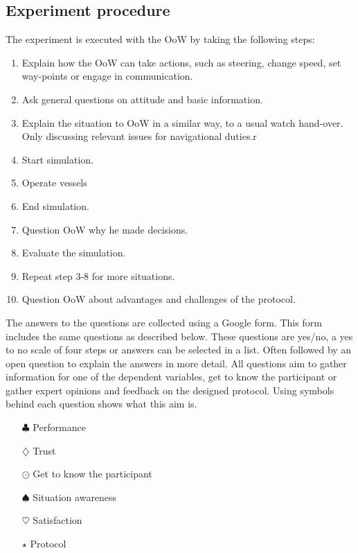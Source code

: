 \subsection{Experiment procedure}
The experiment is executed with the \acf{OoW} by taking the following steps:
\begin{enumerate}
	\item Explain how the OoW can take actions, such as steering, change speed, set way-points or engage in communication.
	\item Ask general questions on attitude and basic information.
	\item Explain the situation to OoW in a similar way, to a usual watch hand-over. Only discussing relevant issues for navigational duties.r
	\item Start simulation.
	\item Operate vessels
	\item End simulation.
	\item Question OoW why he made decisions.
	\item Evaluate the simulation.
	\item Repeat step 3-8 for more situations.
	\item Question OoW about advantages and challenges of the protocol.
\end{enumerate}
The answers to the questions are collected using a Google form. This form includes the same questions as described below. These questions are yes/no, a yes to no scale of four steps or answers can be selected in a list. Often followed by an open question to explain the answers in more detail. 
All questions aim to gather information for one of the dependent variables, get to know the participant or gather expert opinions and feedback on the designed protocol. Using symbols behind each question shows what this aim is.
\begin{multicols}{2}
	\begin{itemize}
		\item[$\clubsuit$] Performance
		\item[$\diamondsuit$] Trust
		\item[$\odot$] Get to know the participant
		\item[$\spadesuit$] Situation awareness
		\item[$\heartsuit$] Satisfaction
		\item[$\star$] Protocol
	\end{itemize}
\end{multicols}



